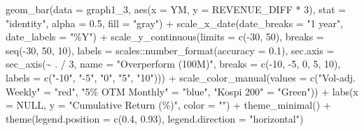\documentclass[
  a4paper,
  DIV=11,
  numbers=noendperiod]{scrreprt}
\newenvironment{Shaded}{\begin{snugshade}}{\end{snugshade}}
\newcommand{\AttributeTok}[1]{\textcolor[rgb]{0.40,0.45,0.13}{#1}}
\newcommand{\ConstantTok}[1]{\textcolor[rgb]{0.56,0.35,0.01}{#1}}
\newcommand{\DecValTok}[1]{\textcolor[rgb]{0.68,0.00,0.00}{#1}}
\newcommand{\FloatTok}[1]{\textcolor[rgb]{0.68,0.00,0.00}{#1}}
\newcommand{\FunctionTok}[1]{\textcolor[rgb]{0.28,0.35,0.67}{#1}}
\newcommand{\NormalTok}[1]{\textcolor[rgb]{0.00,0.23,0.31}{#1}}
\newcommand{\OtherTok}[1]{\textcolor[rgb]{0.00,0.23,0.31}{#1}}
\newcommand{\SpecialCharTok}[1]{\textcolor[rgb]{0.37,0.37,0.37}{#1}}
\newcommand{\StringTok}[1]{\textcolor[rgb]{0.13,0.47,0.30}{#1}}
\begin{document}
\begin{Shaded}
\begin{Highlighting}[]
  \FunctionTok{geom\_bar}\NormalTok{(}\AttributeTok{data =}\NormalTok{ graph1\_3, }\FunctionTok{aes}\NormalTok{(}\AttributeTok{x =}\NormalTok{ YM, }\AttributeTok{y =}\NormalTok{ REVENUE\_DIFF }\SpecialCharTok{*} \DecValTok{3}\NormalTok{),}
           \AttributeTok{stat =} \StringTok{"identity"}\NormalTok{, }\AttributeTok{alpha =} \FloatTok{0.5}\NormalTok{, }\AttributeTok{fill =} \StringTok{"gray"}\NormalTok{) }\SpecialCharTok{+}
  \FunctionTok{scale\_x\_date}\NormalTok{(}\AttributeTok{date\_breaks =} \StringTok{"1 year"}\NormalTok{, }\AttributeTok{date\_labels =} \StringTok{"\%Y"}\NormalTok{) }\SpecialCharTok{+}
  \FunctionTok{scale\_y\_continuous}\NormalTok{(}\AttributeTok{limits =} \FunctionTok{c}\NormalTok{(}\SpecialCharTok{{-}}\DecValTok{30}\NormalTok{, }\DecValTok{50}\NormalTok{), }\AttributeTok{breaks =} \FunctionTok{seq}\NormalTok{(}\SpecialCharTok{{-}}\DecValTok{30}\NormalTok{, }\DecValTok{50}\NormalTok{, }\DecValTok{10}\NormalTok{), }\AttributeTok{labels =}\NormalTok{ scales}\SpecialCharTok{::}\FunctionTok{number\_format}\NormalTok{(}\AttributeTok{accuracy =} \FloatTok{0.1}\NormalTok{),}
                     \AttributeTok{sec.axis =} \FunctionTok{sec\_axis}\NormalTok{(}\SpecialCharTok{\textasciitilde{}}\NormalTok{ . }\SpecialCharTok{/} \DecValTok{3}\NormalTok{, }\AttributeTok{name =} \StringTok{"Overperform (100M)"}\NormalTok{, }\AttributeTok{breaks =} \FunctionTok{c}\NormalTok{(}\SpecialCharTok{{-}}\DecValTok{10}\NormalTok{, }\SpecialCharTok{{-}}\DecValTok{5}\NormalTok{, }\DecValTok{0}\NormalTok{, }\DecValTok{5}\NormalTok{, }\DecValTok{10}\NormalTok{), }\AttributeTok{labels =} \FunctionTok{c}\NormalTok{(}\StringTok{"{-}10"}\NormalTok{, }\StringTok{"{-}5"}\NormalTok{, }\StringTok{"0"}\NormalTok{, }\StringTok{"5"}\NormalTok{, }\StringTok{"10"}\NormalTok{))) }\SpecialCharTok{+}
  \FunctionTok{scale\_color\_manual}\NormalTok{(}\AttributeTok{values =} \FunctionTok{c}\NormalTok{(}\StringTok{"Vol{-}adj. Weekly"} \OtherTok{=} \StringTok{"red"}\NormalTok{, }\StringTok{"5\% OTM Monthly"} \OtherTok{=} \StringTok{"blue"}\NormalTok{, }\StringTok{"Kospi 200"} \OtherTok{=} \StringTok{"Green"}\NormalTok{)) }\SpecialCharTok{+}
  \FunctionTok{labs}\NormalTok{(}\AttributeTok{x =} \ConstantTok{NULL}\NormalTok{, }\AttributeTok{y =} \StringTok{"Cumulative Return (\%)"}\NormalTok{, }\AttributeTok{color =} \StringTok{""}\NormalTok{) }\SpecialCharTok{+}
  \FunctionTok{theme\_minimal}\NormalTok{() }\SpecialCharTok{+}
  \FunctionTok{theme}\NormalTok{(}\AttributeTok{legend.position =} \FunctionTok{c}\NormalTok{(}\FloatTok{0.4}\NormalTok{, }\FloatTok{0.93}\NormalTok{), }\AttributeTok{legend.direction =} \StringTok{"horizontal"}\NormalTok{)}


\end{Highlighting}
\end{Shaded}
\end{document}
